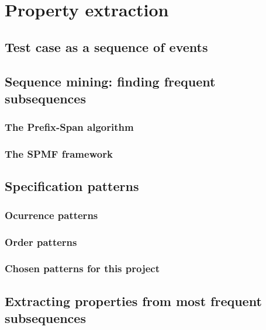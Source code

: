 \chapter{Property extraction}
\label{cap:propextract}

\section{Test case as a sequence of events}

\section{Sequence mining: finding frequent subsequences}

\subsection{The Prefix-Span algorithm}

\subsection{The SPMF framework}

\section{Specification patterns}

\subsection{Ocurrence patterns}

\subsection{Order patterns}

\subsection{Chosen patterns for this project}

\section{Extracting properties from most frequent subsequences}
